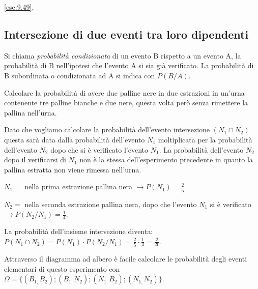 \ref{ese:9.49}, 

\subsection{Intersezione di due eventi tra loro dipendenti}
\begin{definizione}
Si chiama \emph{probabilità condizionata} di un evento B rispetto a un 
evento 
A, la probabilità di B nell'ipotesi che l'evento A si sia già verificato. 
La probabilità di B subordinata o condizionata ad A si indica con $P(B/A)$.
\end{definizione}

\begin{esempio}
Calcolare la probabilità di avere due palline nere in due estrazioni in 
un'urna 
contenente tre palline bianche e due nere, questa volta però senza 
rimettere la 
pallina nell'urna.

Dato che vogliamo calcolare la probabilità dell'evento intersezione 
$(N_1\cap 
N_2)$ questa sarà data dalla probabilità dell'evento $N_1$ moltiplicata per 
la 
probabilità dell'evento $N_2$ dopo che si è verificato l'evento $N_1$. La 
probabilità dell'evento $N_2$ dopo il verificarsi di $N_1$ non è la stessa 
dell'esperimento precedente in quanto la pallina estratta non viene rimessa 
nell'urna.
\begin{itemize*}
\item $ N_{1}= $ nella prima estrazione pallina nera $\to P(N_1)=\frac 2 5$
\item$ N_{2}= $ nella seconda estrazione pallina nera, dopo che l'evento 
$N_1$ 
si è verificato $\to P(N_2/N_1)=\frac 1 4$.
\end{itemize*}
\begin{center}
 
\end{center}
La probabilità dell'insieme intersezione diventa: $P(N_1\cap 
N_2)=P(N_1)\cdot 
P(N_2/N_1)=\frac 2 5\cdot \frac 1 4=\frac 2{20}$.

Attraverso il diagramma ad albero è facile calcolare le probabilità degli 
eventi elementari di questo esperimento con $\Omega 
=\{(B_{1,}B_2);(B_{1,}N_2);(N_{1,}B_2);(N_{1,}N_2)\}$.
\end{esempio}

